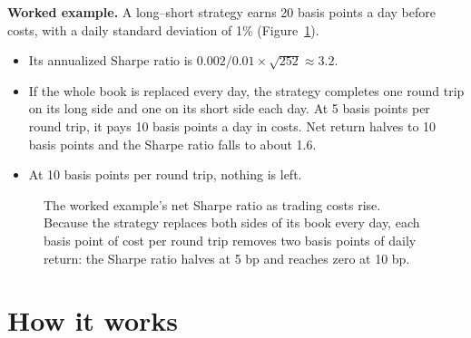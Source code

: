 \textbf{Worked example.} A long--short strategy earns 20 basis points a day before costs, with a daily standard deviation of 1\% (Figure~\ref{fig:23-costs}).

\begin{itemize}
  \item Its annualized Sharpe ratio is $0.002/0.01 \times \sqrt{252} \approx 3.2$.
  \item If the whole book is replaced every day, the strategy completes one round trip on its long side and one on its short side each day. At 5 basis points per round trip, it pays 10 basis points a day in costs. Net return halves to 10 basis points and the Sharpe ratio falls to about 1.6.
  \item At 10 basis points per round trip, nothing is left.
\end{itemize}

\begin{figure}[htbp]
\centering
{}
\caption{The worked example's net Sharpe ratio as trading costs rise. Because the strategy replaces both sides of its book every day, each basis point of cost per round trip removes two basis points of daily return: the Sharpe ratio halves at 5 bp and reaches zero at 10 bp.}
\label{fig:23-costs}
\end{figure}

\section{How it works}
\label{sec:23-how}

